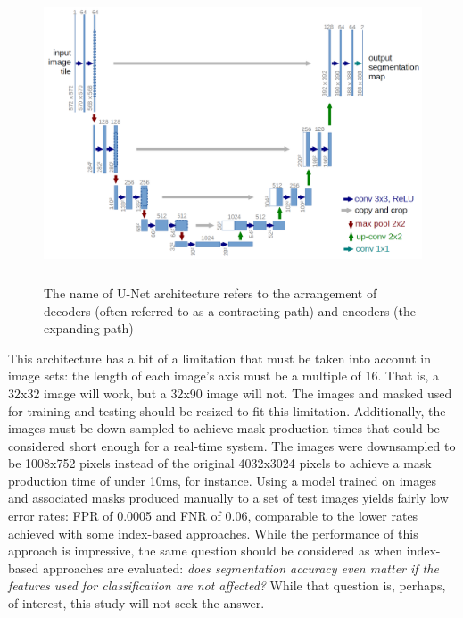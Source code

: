 \documentclass[letterpaper, notitlepage]{report}
\begin{document}
{\begin{figure}[H]
	\centering
	\includegraphics[height=8cm]{figures/u-net-architecture.png}
	\label{fig:u-net}
	\caption[U-Net architecture]{The name of U-Net architecture refers to the arrangement of decoders (often referred to as a contracting path) and encoders (the expanding path)}
\end{figure}
This architecture has a bit of a limitation that must be taken into account in image sets: the length of each image's axis must be a multiple of 16. That is, a 32x32 image will work, but a 32x90 image will not. The images and masked used for training and testing should be resized to fit this limitation. Additionally, the images must be down-sampled to achieve mask production times that could be considered short enough for a real-time system. The images were downsampled to be 1008x752 pixels instead of the original 4032x3024 pixels to achieve a mask production time of under 10ms, for instance. Using a model trained on images and associated masks produced manually to a set of test images yields fairly low error rates: \gls{FPR} of 0.0005 and \gls{FNR} of 0.06, comparable to the lower rates achieved with some index-based approaches. While the performance of this approach is impressive, the same question should be considered as when index-based approaches are evaluated: \textit{does segmentation accuracy even matter if the features used for classification are not affected?} While that question is, perhaps, of interest, this study will not seek the answer.

}
\end{document}
